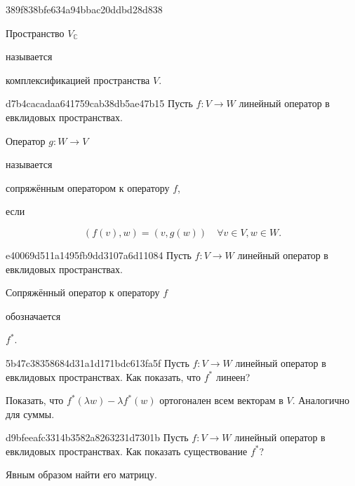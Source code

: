 \begin{note}{389f838bfe634a94bbac20ddbd28d838}
    \begin{icloze}{2}Пространство \({ V_{\mathbb C} }\)\end{icloze} называется \begin{icloze}{1}комплексификацией пространства \({ V }\).\end{icloze}
\end{note}

\begin{note}{d7b4cacadaa641759cab38db5ae47b15}
    Пусть \({ f: V \to W }\) линейный оператор в евклидовых пространствах.
    \begin{icloze}{1}Оператор \({ g : W \to V }\)\end{icloze} называется \begin{icloze}{2}сопряжённым оператором к оператору \({ f }\),\end{icloze} если
    \begin{icloze}{1}
        \[
            (f(v), w) = (v, g(w)) \quad \forall v \in V, w \in W.
        \]
    \end{icloze}
\end{note}

\begin{note}{e40069d511a1495fb9dd3107a6d11084}
    Пусть \({ f: V \to W }\) линейный оператор в евклидовых пространствах.
    \begin{icloze}{2}Сопряжённый оператор к оператору \({ f }\)\end{icloze} обозначается \begin{icloze}{1}\({ f^{*} }\).\end{icloze}
\end{note}

\begin{note}{5b47c38358684d31a1d171bdc613fa5f}
    Пусть \({ f: V \to W }\) линейный оператор в евклидовых пространствах.
    Как показать, что \({ f^* }\) линеен?

    \begin{cloze}{1}
        Показать, что \({ f^*(\lambda w) - \lambda f^* (w) }\) ортогонален всем векторам в \({ V }\). Аналогично для суммы.
    \end{cloze}
\end{note}

\begin{note}{d9bfeeafc3314b3582a8263231d7301b}
    Пусть \({ f: V \to W }\) линейный оператор в евклидовых пространствах.
    Как показать существование \({ f^* }\)?

    \begin{cloze}{1}
        Явным образом найти его матрицу.
    \end{cloze}
\end{note}

